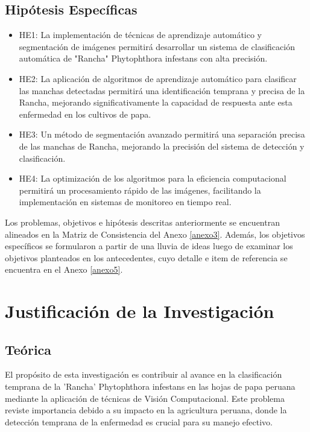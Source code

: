 \subsection{Hipótesis Específicas}
\newcommand{\Hone}{
La implementación de técnicas de aprendizaje automático y segmentación de imágenes permitirá desarrollar un sistema de clasificación automática de "Rancha" Phytophthora infestans con alta precisión.
}
\newcommand{\Htwo}{
La aplicación de algoritmos de aprendizaje automático para clasificar las manchas detectadas permitirá una identificación temprana y precisa de la Rancha, mejorando significativamente la capacidad de respuesta ante esta enfermedad en los cultivos de papa.
}
\newcommand{\Hthree}{
 Un método de segmentación avanzado permitirá una separación precisa de las manchas de Rancha, mejorando la precisión del sistema de detección y clasificación.
}
\newcommand{\Hfour}{
 La optimización de los algoritmos para la eficiencia computacional permitirá un procesamiento rápido de las imágenes, facilitando la implementación en sistemas de monitoreo en tiempo real.
}

\begin{itemize}
	\item HE1: \Hone
	\item HE2: \Htwo
	\item HE3: \Hthree
	\item HE4: \Hfour
\end{itemize}

Los problemas, objetivos e hipótesis descritas anteriormente se encuentran alineados en la Matriz de Consistencia del Anexo \ref{anexo3}. Además, los objetivos específicos se formularon a partir de una lluvia de ideas luego de examinar los objetivos planteados en los antecedentes, cuyo detalle e item de referencia se encuentra en el Anexo \ref{anexo5}.

\section{Justificación de la Investigación}

\subsection{Teórica}
El propósito de esta investigación es contribuir al avance en la clasificación temprana de la 'Rancha' Phytophthora infestans en las hojas de papa peruana mediante la aplicación de técnicas de Visión Computacional. Este problema reviste importancia debido a su impacto en la agricultura peruana, donde la detección temprana de la enfermedad es crucial para su manejo efectivo.

